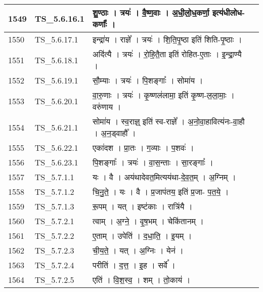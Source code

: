 \documentclass[17pt]{extarticle}
\begin{document}
\begin{longtable}{||p{0.4in}||p{0.9in}||p{4.0in}||p{0.9in}||}
        \hline
            1549 & TS\_5.6.16.1 & शु॒ण्ठाः   ।   त्रयः॑   ।   वै॒ष्ण॒वाः   ।   अ॒धी॒लो॒ध॒कर्णा॒ इत्य॑धीलोध{-}कर्णाः᳚   ।    &      \\
        \hline
            1550 & TS\_5.6.17.1 & इन्द्रा॑य   ।   राज्ञे᳚   ।   त्रयः॑   ।   शि॒ति॒पृ॒ष्ठा इति॑ शिति{-}पृ॒ष्ठाः   ।    &      \\
        \hline
            1551 & TS\_5.6.18.1 & अदि॑त्यै   ।   त्रयः॑   ।   रो॒हि॒तै॒ता इति॑ रोहित{-}ए॒ताः   ।   इ॒न्द्रा॒ण्यै   ।    &      \\
        \hline
            1552 & TS\_5.6.19.1 & सौ॒म्याः   ।   त्रयः॑   ।   पि॒शङ्गाः᳚   ।   सोमा॑य   ।    &      \\
        \hline
            1553 & TS\_5.6.20.1 & वा॒रु॒णाः   ।   त्रयः॑   ।   कृ॒ष्णल॑लामा॒ इति॑ कृ॒ष्ण{-}ल॒ला॒माः॒   ।   वरु॑णाय   ।    &      \\
        \hline
            1554 & TS\_5.6.21.1 & सोमा॑य   ।   स्व॒राज्ञ्॒ इति॑ स्व{-}राज्ञे᳚   ।   अ॒नो॒वा॒हावित्य॑नः{-}वा॒हौ   ।   अ॒न॒ड्वाहौ᳚   ।    &      \\
        \hline
            1555 & TS\_5.6.22.1 & एका॑दश   ।   प्रा॒तः   ।   ग॒व्याः   ।   प॒शवः॑   ।    &      \\
        \hline
            1556 & TS\_5.6.23.1 & पि॒शङ्गाः᳚   ।   त्रयः॑   ।   वा॒स॒न्ताः   ।   सा॒रङ्गाः᳚   ।    &      \\
        \hline
            1557 & TS\_5.7.1.1 & यः   ।   वै   ।   अय॑थादेवत॒मित्यय॑था{-}दे॒व॒त॒म्   ।   अ॒ग्निम्   ।    &      \\
        \hline
            1558 & TS\_5.7.1.2 & चि॒नु॒ते॒   ।   यः   ।   वै   ।   प्र॒जाप॑तय॒ इति॑ प्र॒जा{-} प॒त॒ये॒   ।    &      \\
        \hline
            1559 & TS\_5.7.1.3 & रू॒पम्   ।   यत्   ।   इष्ट॑काः   ।   रात्रि॑यै   ।    &      \\
        \hline
            1560 & TS\_5.7.2.1 & त्वाम्   ।   अ॒ग्ने॒   ।   वृ॒ष॒भम्   ।   चेकि॑तानम्   ।    &      \\
        \hline
            1561 & TS\_5.7.2.2 & ए॒ताम्   ।   उपेति॑   ।   द॒धा॒ति॒   ।   इ॒यम्   ।    &      \\
        \hline
            1562 & TS\_5.7.2.3 & ची॒य॒ते॒   ।   यत्   ।   अ॒ग्निः   ।   येन॑   ।    &      \\
        \hline
            1563 & TS\_5.7.2.4 & परीति॑   ।   द॒त्त॒   ।   इ॒ह   ।   सर्वे᳚   ।    &      \\
        \hline
            1564 & TS\_5.7.2.5 & एति॑   ।   वि॒श॒स्व॒   ।   शम्   ।   तो॒काय॑   ।    &      \\

\end{longtable}
\end{document}
